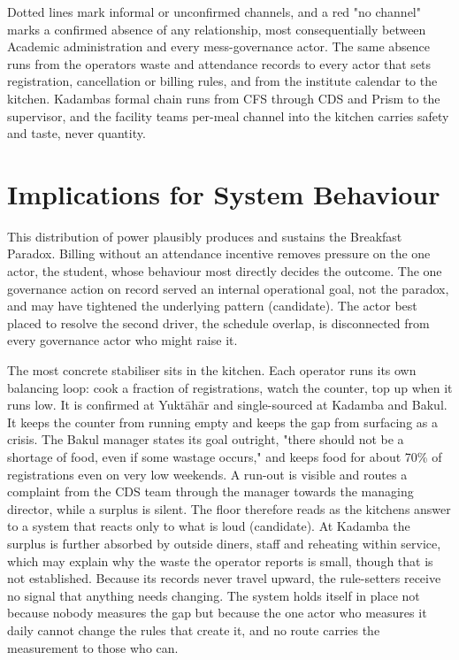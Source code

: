 \documentclass[
  10pt,
  table]{article}
\begin{document}
Dotted lines mark informal or unconfirmed channels, and a red "no channel" marks a confirmed absence of any relationship, most consequentially between Academic administration and every mess-governance actor. The same absence runs from the operators\textquotesingle{} waste and attendance records to every actor that sets registration, cancellation or billing rules, and from the institute calendar to the kitchen. Kadamba\textquotesingle s formal chain runs from CFS through CDS and Prism to the supervisor, and the facility team\textquotesingle s per-meal channel into the kitchen carries safety and taste, never quantity.

\section{Implications for System Behaviour}\label{implications-for-system-behaviour}

This distribution of power plausibly produces and sustains the Breakfast Paradox. Billing without an attendance incentive removes pressure on the one actor, the student, whose behaviour most directly decides the outcome. The one governance action on record served an internal operational goal, not the paradox, and may have tightened the underlying pattern (candidate). The actor best placed to resolve the second driver, the schedule overlap, is disconnected from every governance actor who might raise it.

The most concrete stabiliser sits in the kitchen. Each operator runs its own balancing loop: cook a fraction of registrations, watch the counter, top up when it runs low. It is confirmed at Yuktāhār and single-sourced at Kadamba and Bakul. It keeps the counter from running empty and keeps the gap from surfacing as a crisis. The Bakul manager states its goal outright, "there should not be a shortage of food, even if some wastage occurs," and keeps food for about 70\% of registrations even on very low weekends. A run-out is visible and routes a complaint from the CDS team through the manager towards the managing director, while a surplus is silent. The floor therefore reads as the kitchen\textquotesingle s answer to a system that reacts only to what is loud (candidate). At Kadamba the surplus is further absorbed by outside diners, staff and reheating within service, which may explain why the waste the operator reports is small, though that is not established. Because its records never travel upward, the rule-setters receive no signal that anything needs changing. The system holds itself in place not because nobody measures the gap but because the one actor who measures it daily cannot change the rules that create it, and no route carries the measurement to those who can.
\end{document}
